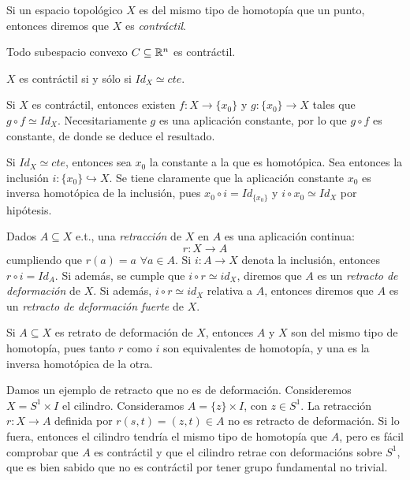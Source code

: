\documentclass[HS.tex]{subfiles}
\begin{document}
\begin{defi}
Si un espacio topológico $X$ es del mismo tipo de homotopía que un punto, entonces diremos que $X$ es \emph{contráctil}.
\end{defi}
\begin{ej}
Todo subespacio convexo $C \subseteq \mathbb{R}^n$ es contráctil.
\end{ej}
\begin{prop}
$X$ es contráctil si y sólo si $Id_X \simeq cte$.
\end{prop}
\begin{dem}
Si $X$ es contráctil, entonces existen $f:X\to \{x_0\}$ y $g:\{x_0\}\to X$ tales que $g\circ f\simeq Id_X$. Necesitariamente $g$ es una aplicación constante, por lo que $g\circ f$ es constante, de donde se deduce el resultado.

Si $Id_X \simeq cte$, entonces sea $x_0$ la constante a la que es homotópica. Sea entonces la inclusión $i:\{x_0\}\hookrightarrow X$. Se tiene claramente que la aplicación constante $x_0$ es inversa homotópica de la inclusión, pues $x_0\circ i=Id_{\{x_0\}}$ y $i\circ x_0\simeq Id_X$ por hipótesis. \QED
\end{dem}

\begin{defi}
Dados $A \subseteq X$ e.t., una \emph{retracción} de $X$ en $A$ es una aplicación continua:
\[ r \colon X \to A \]
cumpliendo que $r(a) = a$ $\forall a \in A$.
Si $i \colon A \to X$ denota la inclusión, entonces $r \circ i = Id_A$.
Si además, se cumple que $i \circ r \simeq id_X$, diremos que $A$ es un \emph{retracto de deformación} de $X$.
Si además, $i \circ r \simeq id_X$ relativa a $A$, entonces diremos que $A$ es un \emph{retracto de deformación fuerte} de $X$.
\end{defi}

\begin{nota}
Si $A \subseteq X$ es retrato de deformación de $X$, entonces $A$ y $X$ son del mismo tipo de homotopía, pues tanto $r$ como $i$ son equivalentes de homotopía, y una es la inversa homotópica de la otra.
\end{nota}
\begin{ej}
Damos un ejemplo de retracto que no es de deformación.
Consideremos $X = S^1 \times I$ el cilindro. Consideramos $A = \{z\} \times I$, con $z \in S^1$.
La retracción $r \colon X \to A$ definida por $r(s,t) = (z,t) \in A$ no es retracto de deformación. Si lo fuera, entonces el cilindro tendría el mismo tipo de homotopía que $A$, pero es fácil comprobar que $A$ es contráctil y que el cilindro retrae con deformacións sobre $S^1$, que es bien sabido que no es contráctil por tener grupo fundamental no trivial.
\end{ej}
\end{document}
